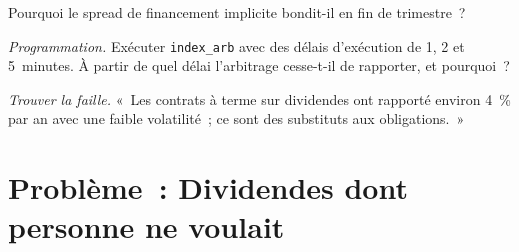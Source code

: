 \begin{exercise}[$\star\star$]\label{exo:s2:delta-one-and-dividends:6}
Pourquoi le spread de financement implicite bondit-il en fin de trimestre~?
\end{exercise}

\begin{exercise}[$\star\star\star$]\label{exo:s2:delta-one-and-dividends:7}
\emph{Programmation.} Exécuter \texttt{index\_arb} avec des délais d'exécution de 1, 2 et 5~minutes. À partir de quel délai l'arbitrage cesse-t-il de rapporter, et pourquoi~?
\end{exercise}

\begin{exercise}[$\star\star\star$]\label{exo:s2:delta-one-and-dividends:8}
\emph{Trouver la faille.} «~Les contrats à terme sur dividendes ont rapporté environ 4~\% par an avec une faible volatilité~; ce sont des substituts aux obligations.~»
\end{exercise}

\section{Problème~: Dividendes dont personne ne voulait}

